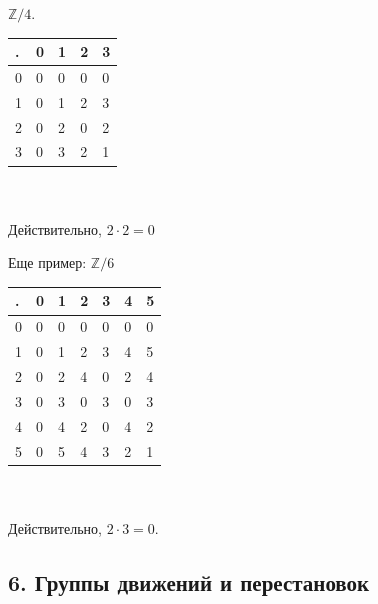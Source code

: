 \documentclass[]{book}
\theoremstyle{definition}
\newcommand{\bb}[1]{\mathbb{#1}}
\begin{document}
\begin{enumerate}[resume]
\begin{minipage}{0.3\textwidth}
$\bb{Z}/4$.
\begin{tabular}{ | l || l | l | l | l | }
\hline
. & 0 & 1 & 2 & 3      \\ \hline \hline
0 & 0 & 0 & 0 & 0      \\ \hline
1 & 0 & 1 & 2 & 3      \\ \hline
2 & 0 & 2 & 0 & 2      \\ \hline
3 & 0 & 3 & 2 & 1      \\
\hline
\end{tabular}
\\\\
Действительно, $2\cdot 2 = 0$
\end{minipage}
\begin{minipage}{0.5\textwidth}
Еще пример: $\bb{Z}/6$
\begin{tabular}{ | l || l | l | l | l | l | l | }
\hline
. & 0 & 1 & 2 & 3 & 4 & 5   \\ \hline \hline
0 & 0 & 0 & 0 & 0 & 0 & 0   \\ \hline
1 & 0 & 1 & 2 & 3 & 4 & 5   \\ \hline
2 & 0 & 2 & 4 & 0 & 2 & 4   \\ \hline
3 & 0 & 3 & 0 & 3 & 0 & 3   \\ \hline
4 & 0 & 4 & 2 & 0 & 4 & 2   \\ \hline
5 & 0 & 5 & 4 & 3 & 2 & 1   \\
\hline
\end{tabular}
\\\\
 Действительно, $2\cdot 3 = 0$.
\end{minipage}


\end{enumerate}

\subsection*{6. Группы движений и перестановок}
\end{document}

